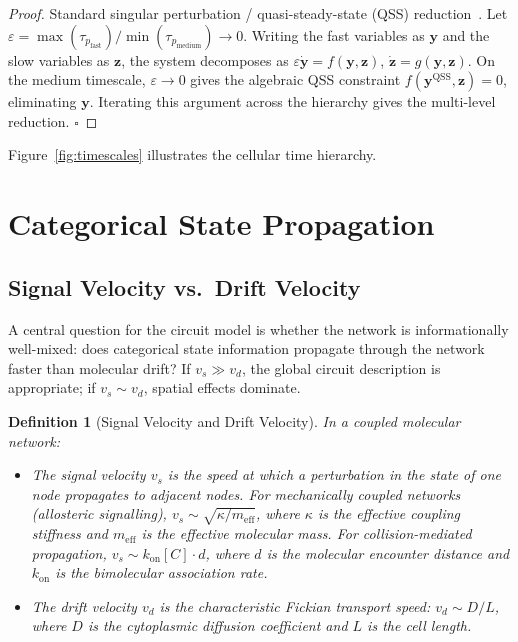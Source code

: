\documentclass[twocolumn,10pt,a4paper]{article}
\newcommand{\taup}{\tau_p}
\newtheorem{definition}[theorem]{Definition}
\begin{document}
\begin{proof}
Standard singular perturbation / quasi-steady-state (QSS) reduction~\cite{Murray2002}.
Let $\varepsilon=\max(\taup_{\mathrm{fast}})/\min(\taup_{\mathrm{medium}})\to 0$.
Writing the fast variables as $\mathbf{y}$ and the slow variables as
$\mathbf{z}$, the system decomposes as $\varepsilon\dot{\mathbf{y}}=
f(\mathbf{y},\mathbf{z})$, $\dot{\mathbf{z}}=g(\mathbf{y},\mathbf{z})$.
On the medium timescale, $\varepsilon\to 0$ gives the algebraic QSS constraint
$f(\mathbf{y}^{\mathrm{QSS}},\mathbf{z})=0$, eliminating $\mathbf{y}$.
Iterating this argument across the hierarchy gives the multi-level reduction.
$\square$
\end{proof}

Figure~\ref{fig:timescales} illustrates the cellular time hierarchy.



\section{Categorical State Propagation}
\label{sec:propagation}

\subsection{Signal Velocity vs.\ Drift Velocity}
\label{sec:prop-velocity}

A central question for the circuit model is whether the network is
informationally well-mixed: does categorical state information propagate
through the network faster than molecular drift?  If $v_s\gg v_d$, the global
circuit description is appropriate; if $v_s\sim v_d$, spatial effects dominate.

\begin{definition}[Signal Velocity and Drift Velocity]
\label{def:velocities}
In a coupled molecular network:
\begin{itemize}[noitemsep]
  \item The \emph{signal velocity} $v_s$ is the speed at which a perturbation
        in the state of one node propagates to adjacent nodes.  For
        mechanically coupled networks (allosteric signalling), $v_s\sim
        \sqrt{\kappa/m_{\mathrm{eff}}}$, where $\kappa$ is the effective
        coupling stiffness and $m_{\mathrm{eff}}$ is the effective molecular
        mass.  For collision-mediated propagation,
        $v_s\sim k_{\mathrm{on}}[C]\cdot d$, where $d$ is the molecular
        encounter distance and $k_{\mathrm{on}}$ is the bimolecular
        association rate.
  \item The \emph{drift velocity} $v_d$ is the characteristic Fickian
        transport speed: $v_d\sim D/L$, where $D$ is the cytoplasmic
        diffusion coefficient and $L$ is the cell length.
\end{itemize}
\end{definition}
\end{document}
